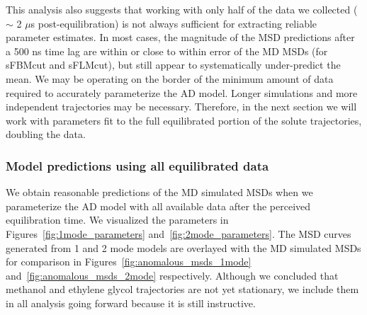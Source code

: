 \documentclass{article}
\begin{document}
  This analysis also suggests that working with only half of the data we collected
  ($\sim$ 2 $\mu$s post-equilibration) is not always sufficient for extracting reliable
  parameter estimates. In most cases, the magnitude of the MSD predictions after a 
  500 ns time lag are within or close to within error of the MD MSDs (for sFBMcut and
  sFLMcut), but still appear to systematically under-predict the mean. We may be
  operating on the border of the minimum amount of data required to accurately 
  parameterize the AD model. Longer simulations and more independent trajectories may
  be necessary. Therefore, in the next section we will work with parameters fit to the
  full equilibrated portion of the solute trajectories, doubling the data.
  
  

 
  
  \subsubsection{Model predictions using all equilibrated data}\label{section:AD_all_data}
  
  We obtain reasonable predictions of the MD simulated MSDs when we parameterize the AD 
  model with all available data after the perceived equilibration time. We visualized the
  parameters in Figures~\ref{fig:1mode_parameters} and~\ref{fig:2mode_parameters}.
  The MSD curves generated from 1 and 2 mode models are overlayed with the MD simulated MSDs for 
  comparison in Figures~\ref{fig:anomalous_msds_1mode} and~\ref{fig:anomalous_msds_2mode}
  respectively. Although we concluded that methanol and ethylene glycol trajectories are
  not yet stationary, we include them in all analysis going forward because it is still
  instructive.
  
\end{document}

